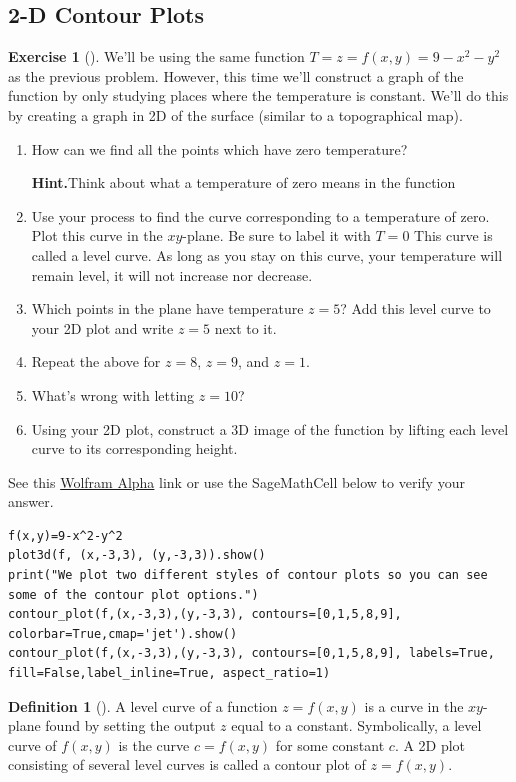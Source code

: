 \documentclass[10pt,]{book}
\theoremstyle{plain}
\theoremstyle{definition}
\newtheorem{definition}[theorem]{Definition}
\theoremstyle{definition}
\theoremstyle{definition}
\theoremstyle{definition}
\newtheorem{exploration}[project]{Exercise}
\theoremstyle{definition}
\numberwithin{equation}{section}
\begin{document}
\subsection[{2-D Contour Plots}]{2-D Contour Plots}\label{subsection-26}
\begin{exploration}[]\label{prob_intro_to_contour_plots}
We'll be using the same function \(T=z=f(x,y)=9-x^2-y^2\) as the previous problem. However, this time we'll construct a graph of the function by only studying places where the temperature is constant. We'll do this by creating a graph in 2D of the surface (similar to a topographical map).%
\begin{enumerate}[font=\bfseries,label=(\alph*),ref=\alph*]
\item\label{task-210} How can we find all the points which have zero temperature?%
\par\medskip\noindent%
\textbf{Hint.}\quad Think about what a temperature of zero means in the function%
\item\label{task-211} Use your process to find the curve corresponding to a temperature of zero. Plot this curve in the \(xy\)-plane. Be sure to label it with \(T=0\) This curve is called a level curve. As long as you stay on this curve, your temperature will remain level, it will not increase nor decrease.%
\item\label{task-212} Which points in the plane have temperature \(z=5\)?  Add this level curve to your 2D plot and write \(z=5\) next to it.%
\item\label{task-213} Repeat the above for \(z=8\), \(z=9\), and \(z=1\).%
\item\label{task-214} What's wrong with letting \(z=10\)?%
\item\label{task-215} Using your 2D plot, construct a 3D image of the function by lifting each level curve to its corresponding height.%
\end{enumerate}
\bigbreak
See this \href{http://wolfr.am/wny0IF}{Wolfram Alpha} link or use the SageMathCell below to verify your answer.%
\begin{lstlisting}[style=sageinput]
f(x,y)=9-x^2-y^2
plot3d(f, (x,-3,3), (y,-3,3)).show()
print("We plot two different styles of contour plots so you can see some of the contour plot options.")
contour_plot(f,(x,-3,3),(y,-3,3), contours=[0,1,5,8,9], colorbar=True,cmap='jet').show()
contour_plot(f,(x,-3,3),(y,-3,3), contours=[0,1,5,8,9], labels=True, fill=False,label_inline=True, aspect_ratio=1)
\end{lstlisting}
\end{exploration}
\begin{definition}[{}]\label{definition-22}
A level curve of a function \(z=f(x,y)\) is a curve in the \(xy\)-plane found by setting the output \(z\) equal to a constant. Symbolically, a level curve of \(f(x,y)\) is the curve \(c=f(x,y)\) for some constant \(c\). A 2D plot consisting of several level curves is called a contour plot of \(z=f(x,y)\).%
\end{definition}
\typeout{************************************************}
\typeout{************************************************}
\end{document}
